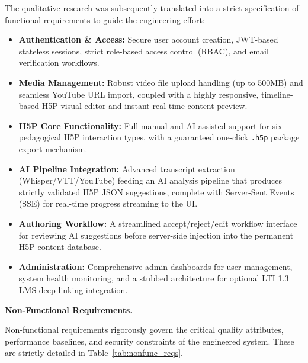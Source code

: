 The qualitative research was subsequently translated into a strict specification of functional requirements to guide the engineering effort:
\begin{itemize}
  \item \textbf{Authentication \& Access:} Secure user account creation, JWT-based stateless sessions, strict role-based access control (RBAC), and email verification workflows.
  \item \textbf{Media Management:} Robust video file upload handling (up to 500MB) and seamless YouTube URL import, coupled with a highly responsive, timeline-based H5P visual editor and instant real-time content preview.
  \item \textbf{H5P Core Functionality:} Full manual and AI-assisted support for six pedagogical H5P interaction types, with a guaranteed one-click \texttt{.h5p} package export mechanism.
  \item \textbf{AI Pipeline Integration:} Advanced transcript extraction (Whisper/VTT/YouTube) feeding an AI analysis pipeline that produces strictly validated H5P JSON suggestions, complete with Server-Sent Events (SSE) for real-time progress streaming to the UI.
  \item \textbf{Authoring Workflow:} A streamlined accept/reject/edit workflow interface for reviewing AI suggestions before server-side injection into the permanent H5P content database.
  \item \textbf{Administration:} Comprehensive admin dashboards for user management, system health monitoring, and a stubbed architecture for optional LTI 1.3 LMS deep-linking integration.
\end{itemize}

\textbf{Non-Functional Requirements.}

Non-functional requirements rigorously govern the critical quality attributes, performance baselines, and security constraints of the engineered system. These are strictly detailed in Table~\ref{tab:nonfunc_reqs}.

